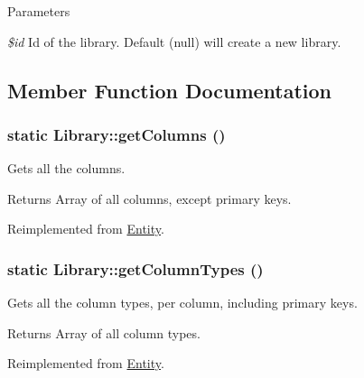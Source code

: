 \begin{DoxyParams}{Parameters}
\item[{\em \$id}]Id of the library. Default (null) will create a new library. \end{DoxyParams}


\subsection{Member Function Documentation}
\hypertarget{classLibrary_ab67ca6733ca346dccb066c7333ef3426}{
\subsubsection[{getColumns}]{\setlength{\rightskip}{0pt plus 5cm}static Library::getColumns ()}}
\label{classLibrary_ab67ca6733ca346dccb066c7333ef3426}
Gets all the columns.

\begin{DoxyReturn}{Returns}
Array of all columns, except primary keys. 
\end{DoxyReturn}


Reimplemented from \hyperlink{classEntity_a394717a08ffd54ec9a14d06727c86719}{Entity}.

\hypertarget{classLibrary_aa18ef5cf611b855ccbe55283b41e93b6}{
\subsubsection[{getColumnTypes}]{\setlength{\rightskip}{0pt plus 5cm}static Library::getColumnTypes ()}}
\label{classLibrary_aa18ef5cf611b855ccbe55283b41e93b6}
Gets all the column types, per column, including primary keys.

\begin{DoxyReturn}{Returns}
Array of all column types. 
\end{DoxyReturn}


Reimplemented from \hyperlink{classEntity_ad69437219c10955803707fbf6ac458e7}{Entity}.

